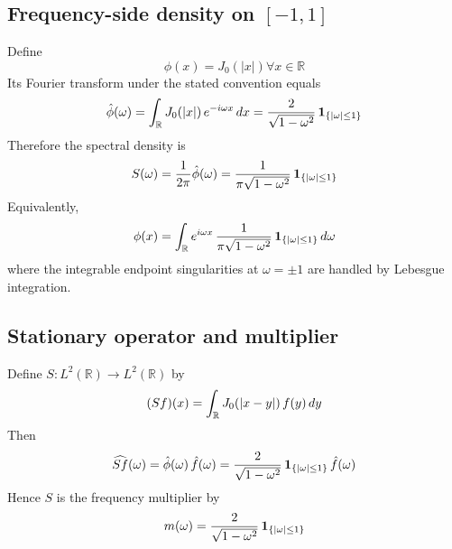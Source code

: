 \documentclass{article}
\begin{document}
\subsection{Frequency-side density on $[- 1, 1]$}

Define
\begin{equation}
  \phi (x) = J_0 (|x|) \forall x \in \mathbb{R}
\end{equation}
Its Fourier transform under the stated convention equals
\begin{equation}
  \hat{\phi} (\omega) = \int_{\mathbb{R}} J_0 (|x|)  \hspace{0.17em} e^{- i
  \omega x}  \hspace{0.17em} dx = \frac{2}{\sqrt{1 - \omega^2}} 
  \hspace{0.17em} \textbf{1}_{\{| \omega | \le 1\}}
\end{equation}
Therefore the spectral density is
\begin{equation}
  S (\omega) = \frac{1}{2 \pi}  \hat{\phi} (\omega) = \frac{1}{\pi \sqrt{1 -
  \omega^2}}  \hspace{0.17em} \textbf{1}_{\{| \omega | \le 1\}}
\end{equation}
Equivalently,
\begin{equation}
  \phi (x) = \int_{\mathbb{R}} e^{i \omega x}  \hspace{0.17em} \frac{1}{\pi
  \sqrt{1 - \omega^2}}  \hspace{0.17em} \textbf{1}_{\{| \omega | \le 1\}} 
  \hspace{0.17em} d \omega
\end{equation}
where the integrable endpoint singularities at $\omega = \pm 1$ are handled by
Lebesgue integration.

\subsection{Stationary operator and multiplier}

Define $S : L^2 (\mathbb{R}) \to L^2 (\mathbb{R})$ by
\begin{equation}
  (Sf) (x) = \int_{\mathbb{R}} J_0 (|x - y|)  \hspace{0.17em} f (y) 
  \hspace{0.17em} dy
\end{equation}
Then
\begin{equation}
  \widehat{Sf} (\omega) = \hat{\phi} (\omega)  \hspace{0.17em} \hat{f}
  (\omega) = \frac{2}{\sqrt{1 - \omega^2}}  \hspace{0.17em} \textbf{1}_{\{|
  \omega | \le 1\}}  \hspace{0.17em} \hat{f} (\omega)
\end{equation}
Hence $S$ is the frequency multiplier by
\begin{equation}
  m (\omega) = \frac{2}{\sqrt{1 - \omega^2}}  \hspace{0.17em} \textbf{1}_{\{|
  \omega | \le 1\}}
\end{equation}
\end{document}
